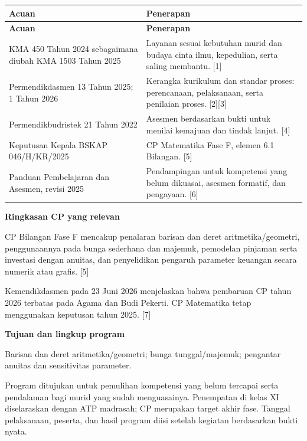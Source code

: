 \documentclass[11pt,a4paper]{article}
\begin{document}
{\small\setlength{\tabcolsep}{2mm}\renewcommand{\arraystretch}{1.35}\begin{longtable}{|>{\raggedright\arraybackslash}p{60.554mm}|>{\raggedright\arraybackslash}p{108.996mm}|}\hline
\rowcolor{gray!10}\textbf{Acuan} & \textbf{Penerapan}\\ \hline
\endfirsthead
\rowcolor{gray!10}\textbf{Acuan} & \textbf{Penerapan}\\ \hline
\endhead
KMA 450 Tahun 2024 sebagaimana diubah KMA 1503 Tahun 2025 & Layanan sesuai kebutuhan murid dan budaya cinta ilmu, kepedulian, serta saling membantu. [1]\\ \hline
Permendikdasmen 13 Tahun 2025; 1 Tahun 2026 & Kerangka kurikulum dan standar proses: perencanaan, pelaksanaan, serta penilaian proses. [2][3]\\ \hline
Permendikbudristek 21 Tahun 2022 & Asesmen berdasarkan bukti untuk menilai kemajuan dan tindak lanjut. [4]\\ \hline
Keputusan Kepala BSKAP 046/H/KR/2025 & CP Matematika Fase F, elemen 6.1 Bilangan. [5]\\ \hline
Panduan Pembelajaran dan Asesmen, revisi 2025 & Pendampingan untuk kompetensi yang belum dikuasai, asesmen formatif, dan pengayaan. [6]\\ \hline
\end{longtable}}\medskip
\par\medskip\noindent\textbf{Ringkasan CP yang relevan}\par\smallskip
CP Bilangan Fase F mencakup penalaran barisan dan deret aritmetika/geometri, penggunaannya pada bunga sederhana dan majemuk, pemodelan pinjaman serta investasi dengan anuitas, dan penyelidikan pengaruh parameter keuangan secara numerik atau grafis. [5]\par\medskip
{\small Kemendikdasmen pada 23 Juni 2026 menjelaskan bahwa pembaruan CP tahun 2026 terbatas pada Agama dan Budi Pekerti. CP Matematika tetap menggunakan keputusan tahun 2025. [7]\par}\medskip
\par\medskip\noindent\textbf{Tujuan dan lingkup program}\par\smallskip
Barisan dan deret aritmetika/geometri; bunga tunggal/majemuk; pengantar anuitas dan sensitivitas parameter.\par\medskip
{\small Program ditujukan untuk pemulihan kompetensi yang belum tercapai serta pendalaman bagi murid yang sudah menguasainya. Penempatan di kelas XI diselaraskan dengan ATP madrasah; CP merupakan target akhir fase. Tanggal pelaksanaan, peserta, dan hasil program diisi setelah kegiatan berdasarkan bukti nyata.\par}\medskip
\end{document}
